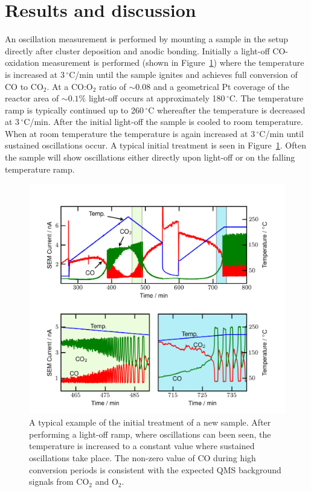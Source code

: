 \documentclass[journal=jacsat,manuscript=article]{achemso}
\begin{document}
\section{Results and discussion}
An oscillation measurement is performed by mounting a sample in the setup
directly after cluster deposition and anodic bonding. Initially a light-off
CO-oxidation measurement is performed (shown in Figure~\ref{fgr:initial_treatment}) where
the temperature is increased at 3\,$^\circ$C/min until the sample ignites and
achieves full conversion of CO to CO$_2$. At a CO:O$_2$ ratio of $\sim0.08$ and a
geometrical Pt coverage of the reactor area of $\sim0.1\%$ light-off occurs at approximately
180\,$^\circ$C. The temperature ramp is typically continued up to
260\,$^\circ$C whereafter the temperature is decreased at 3\,$^\circ$C/min.
After the initial light-off the sample is cooled to room
temperature. When at room temperature the temperature is again increased at
3\,$^\circ$C/min until sustained oscillations occur. A typical initial
treatment is seen in Figure~\ref{fgr:initial_treatment}. Often the sample will
show oscillations either directly upon light-off or on the falling temperature
ramp.

\begin{figure}
  \includegraphics[width=12cm]{initial_treatment.png} 
  \caption{A typical example of the initial treatment of a new sample. After
  performing a light-off ramp, where oscillations can been seen, the temperature
  is increased to a constant value where sustained oscillations take place. The
  non-zero value of CO during high conversion periods is consistent with the
  expected QMS background signals from CO$_2$ and O$_2$.}
  \label{fgr:initial_treatment}
\end{figure}
\end{document}
